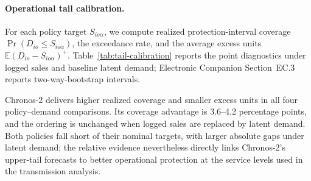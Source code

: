 \documentclass[msom,dblanonrev]{informs4}
\begin{document}
\paragraph{Operational tail calibration.}
For each policy target $S_{io\alpha}$, we compute realized protection-interval coverage $\Pr(D_{io}\leq S_{io\alpha})$, the exceedance rate, and the average excess units $\mathbb{E}(D_{io}-S_{io\alpha})^+$.
Table~\ref{tab:tail-calibration} reports the point diagnostics under logged sales and baseline latent demand; Electronic Companion Section~EC.3 reports two-way-bootstrap intervals.

\begin{table}[ht]
\caption{Tail calibration at the operational service levels. Coverage is the fraction of realized protection-interval outcomes at or below the fixed stock target. Mean excess units average $(D-S)^+$ over all scored cells.}\label{tab:tail-calibration}
\centering\small
{}
\end{table}

Chronos-2 delivers higher realized coverage and smaller excess units in all four policy--demand comparisons.
Its coverage advantage is 3.6--4.2 percentage points, and the ordering is unchanged when logged sales are replaced by latent demand.
Both policies fall short of their nominal targets, with larger absolute gaps under latent demand; the relative evidence nevertheless directly links Chronos-2's upper-tail forecasts to better operational protection at the service levels used in the transmission analysis.
\end{document}
